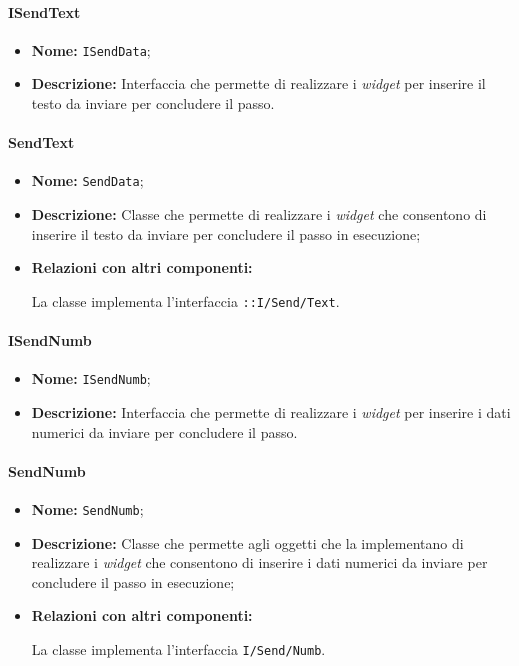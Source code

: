 \paragraph{ISendText}
\begin{itemize}
\item \textbf{Nome:} \texttt{ISendData};
\item \textbf{Descrizione:} Interfaccia che permette di realizzare i \textit{widget} per inserire il testo da inviare per concludere il passo.
\end{itemize}

\paragraph{SendText}
\begin{flushleft}
\begin{itemize}
\item \textbf{Nome:} \texttt{SendData};
\item \textbf{Descrizione:} Classe che permette di realizzare i \textit{widget} che consentono di inserire il testo da inviare per concludere il passo in esecuzione;
\item \textbf{Relazioni con altri componenti:}
\begin{sloppypar}
La classe implementa l'interfaccia \texttt{\iViewUser{}::I\fshyp{}Send\fshyp{}Text}.
\end{sloppypar}
\end{itemize}
\end{flushleft}

\paragraph{ISendNumb}
\begin{itemize}
\item \textbf{Nome:} \texttt{ISendNumb};
\item \textbf{Descrizione:} Interfaccia che permette di realizzare i \textit{widget} per inserire i dati numerici da inviare per concludere il passo.
\end{itemize}

\paragraph{SendNumb}
\begin{flushleft}
\begin{itemize}
\item \textbf{Nome:} \texttt{SendNumb};
\item \textbf{Descrizione:} Classe che permette agli oggetti che la implementano di realizzare i \textit{widget} che consentono di inserire i dati numerici da inviare per concludere il passo in esecuzione;
\item \textbf{Relazioni con altri componenti:}
\begin{sloppypar}
La classe implementa l'interfaccia \texttt{I\fshyp{}Send\fshyp{}Numb}.
\end{sloppypar}
\end{itemize}
\end{flushleft}

